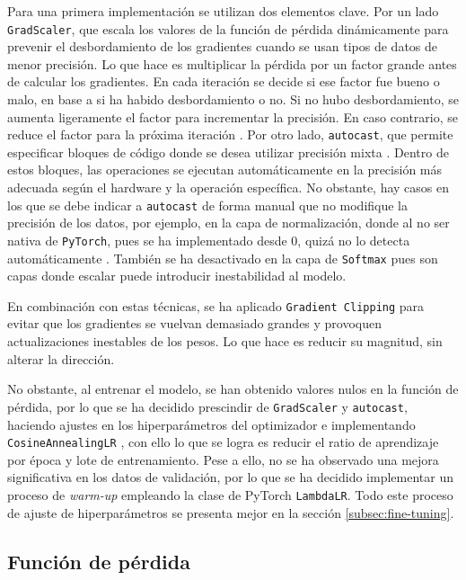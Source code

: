 \documentclass[11pt]{book}
\begin{document}
Para una primera implementación se utilizan dos elementos clave. Por un lado \texttt{GradScaler}, que escala los valores de la función de pérdida dinámicamente para prevenir el desbordamiento de los gradientes cuando se usan tipos de datos de menor precisión. Lo que hace es multiplicar la pérdida por un factor grande antes de calcular los gradientes. En cada iteración se decide si ese factor fue bueno o malo, en base a si ha habido desbordamiento o no. Si no hubo desbordamiento, se aumenta ligeramente el factor para incrementar la precisión. En caso contrario, se reduce el factor para la próxima iteración \parencite{amit2024mixedprecision}. Por otro lado, \texttt{autocast}, que permite especificar bloques de código donde se desea utilizar precisión mixta \parencite{stack_overflow_gradscaler}. Dentro de estos bloques, las operaciones se ejecutan automáticamente en la precisión más adecuada según el hardware y la operación específica. No obstante, hay casos en los que se debe indicar a \texttt{autocast} de forma manual que no modifique la precisión de los datos, por ejemplo, en la capa de normalización, donde al no ser nativa de \texttt{PyTorch}, pues se ha implementado desde 0, quizá no lo detecta automáticamente \parencite{amit2024mixedprecision}. También se ha desactivado en la capa de \texttt{Softmax} pues son capas donde escalar puede introducir inestabilidad al modelo.

En combinación con estas técnicas, se ha aplicado \texttt{Gradient Clipping} para evitar que los gradientes se vuelvan demasiado grandes y provoquen actualizaciones inestables de los pesos. Lo que hace es reducir su magnitud, sin alterar la dirección. 


No obstante, al entrenar el modelo, se han obtenido valores nulos en la función de pérdida, por lo que se ha decidido prescindir de \texttt{GradScaler} y \texttt{autocast}, haciendo ajustes en los hiperparámetros del optimizador e implementando \texttt{CosineAnnealingLR} \parencite{pytorch_cosineannealinglr}, con ello lo que se logra es reducir el ratio de aprendizaje por época y lote de entrenamiento. Pese a ello, no se ha observado una mejora significativa en los datos de validación, por lo que se ha decidido implementar un proceso de \textit{warm-up} empleando la clase de PyTorch \texttt{LambdaLR}. Todo este proceso de ajuste de hiperparámetros se presenta mejor en la sección \ref{subsec:fine-tuning}.



\subsection{Función de pérdida}
\end{document}
